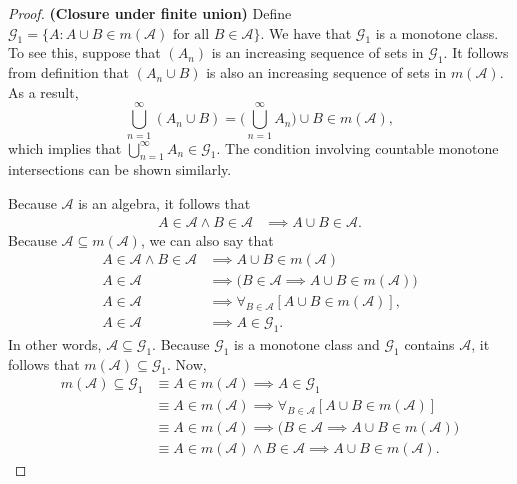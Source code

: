 \documentclass[10pt]{article}
\newcommand{\mcal}[1]{\mathcal{#1}}
\begin{document}
\begin{itemize}
\begin{proof}
    {\bf (Closure under finite union)} Define $\mcal{G}_1 = \{ A : A \cup B \in m(\mcal{A})\mbox{ for all } B \in \mcal{A} \}$. We have that $\mcal{G}_1$ is a monotone class. To see this, suppose that $(A_n)$ is an increasing sequence of sets in $\mcal{G}_1$. It follows from definition that $(A_n \cup B)$ is also an increasing sequence of sets in $m(\mcal{A})$. As a result, $$\bigcup_{n=1}^\infty (A_n \cup B) = \Big( \bigcup_{n=1}^\infty A_n \Big) \cup B \in m(\mcal{A}),$$
    which implies that $\bigcup_{n=1}^\infty A_n \in \mcal{G}_1$. The condition involving countable monotone intersections can be shown similarly. 
    
    Because $\mcal{A}$ is an algebra, it follows that
    \begin{align*}
      A \in \mcal{A} \wedge B \in \mcal{A} &\implies A \cup B \in \mcal{A}.
    \end{align*}
    Because $\mcal{A} \subseteq m(\mcal{A})$, we can also say that
    \begin{align*}
      A \in \mcal{A} \wedge B \in \mcal{A} &\implies A \cup B \in m(\mcal{A}) \\
      A \in \mcal{A} &\implies \Big( B \in \mcal{A} \implies A \cup B \in m(\mcal{A}) \Big) \\
      A \in \mcal{A} &\implies \forall_{B \in \mcal{A}} [ A \cup B \in m(\mcal{A}) ], \\
      A \in \mcal{A} &\implies A \in \mcal{G}_1.
    \end{align*}
    In other words, $\mcal{A} \subseteq \mcal{G}_1$. Because $\mcal{G}_1$ is a monotone class and $\mcal{G}_1$ contains $\mcal{A}$, it follows that $m(\mcal{A}) \subseteq \mcal{G}_1$.
    Now,
    \begin{align*}
      m(\mcal{A}) \subseteq \mcal{G}_1 
      &\equiv A \in m(\mcal{A}) \implies A \in \mcal{G}_1 \\
      &\equiv A \in m(\mcal{A}) \implies \forall_{B \in \mcal{A}} [ A \cup B \in m(\mcal{A})] \\
      &\equiv A \in m(\mcal{A}) \implies \Big( B \in \mcal{A} \implies A \cup B \in m(\mcal{A}) \Big) \\
      &\equiv A \in m(\mcal{A}) \wedge B \in \mcal{A} \implies A \cup B \in m(\mcal{A}).
    \end{align*}
    

\end{proof}
\end{itemize}
\end{document}
